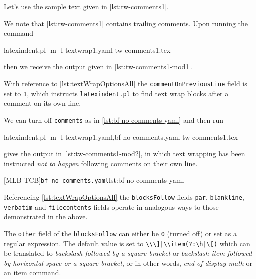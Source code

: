 \documentclass[10pt]{article}
\begin{document}
 \begin{example}
 Let's use the sample text given in \cref{lst:tw-comments1}. 


 We note that \cref{lst:tw-comments1} contains trailing comments. Upon running the
 command

 \begin{commandshell}
latexindent.pl -m -l textwrap1.yaml tw-comments1.tex
\end{commandshell}

 then we receive the output given in \cref{lst:tw-comments1-mod1}.


 With reference to \vref{lst:textWrapOptionsAll} the \texttt{commentOnPreviousLine} field
 is set to \texttt{1}, which instructs \texttt{latexindent.pl} to find text wrap blocks
 after a comment on its own line.

 We can turn off \texttt{comments} as in \cref{lst:bf-no-comments-yaml} and then run

 \begin{commandshell}
latexindent.pl -m -l textwrap1.yaml,bf-no-comments.yaml tw-comments1.tex
\end{commandshell}

 gives the output in \cref{lst:tw-comments1-mod2}, in which text wrapping has been
 instructed \emph{not to happen} following comments on their own line.
 \begin{cmhtcbraster}[raster column skip=.1\linewidth,
   raster left skip=-3.5cm,
   raster right skip=-2cm,
  ]
  [MLB-TCB]{\texttt{bf-no-comments.yaml}}{lst:bf-no-comments-yaml}
 \end{cmhtcbraster}
 \end{example}

 Referencing \vref{lst:textWrapOptionsAll} the \texttt{blocksFollow} fields \texttt{par},
 \texttt{blankline}, \texttt{verbatim} and \texttt{filecontents} fields operate in
 analogous ways to those demonstrated in the above.

 The \texttt{other} field of the \texttt{blocksFollow} can either be \texttt{0} (turned
 off) or set as a regular expression. The default value is set to
 \lstinline!\\\]|\\item(?:\h|\[)! which can be translated to \emph{backslash followed by
 a square bracket} or \emph{backslash item followed by horizontal space or a square
 bracket}, or in other words, \emph{end of display math} or an item command.
\end{document}
